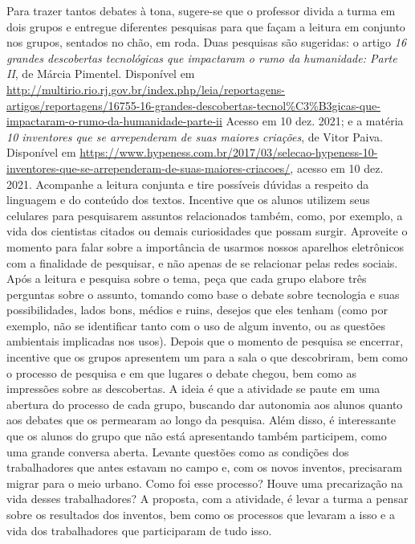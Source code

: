 \documentclass[11pt]{extarticle}
\begin{document}

Para trazer tantos debates à tona, sugere-se que o professor divida a turma em dois grupos e entregue diferentes pesquisas para que façam a leitura em conjunto nos grupos, sentados no chão, em roda. Duas pesquisas são sugeridas: o artigo \textit{16 grandes descobertas tecnológicas que impactaram o rumo da humanidade: Parte II}, de Márcia Pimentel. Disponível em \url{http://multirio.rio.rj.gov.br/index.php/leia/reportagens-artigos/reportagens/16755-16-grandes-descobertas-tecnol%C3%B3gicas-que-impactaram-o-rumo-da-humanidade-parte-ii} Acesso em 10 dez. 2021; e a matéria \textit{10 inventores que se arrependeram de suas maiores criações}, de Vitor Paiva. Disponível em \url{https://www.hypeness.com.br/2017/03/selecao-hypeness-10-inventores-que-se-arrependeram-de-suas-maiores-criacoes/}, acesso em 10 dez. 2021. Acompanhe a leitura conjunta e tire possíveis dúvidas a respeito da linguagem  e do conteúdo dos textos. Incentive que os alunos utilizem seus celulares para pesquisarem assuntos relacionados também, como, por exemplo, a vida dos cientistas citados ou demais curiosidades que possam surgir. Aproveite o momento para falar sobre a importância de usarmos nossos aparelhos eletrônicos com a finalidade de pesquisar, e não apenas de se relacionar pelas redes sociais. Após a leitura e pesquisa sobre o tema, peça que cada grupo elabore três perguntas sobre o assunto, tomando como base o debate sobre tecnologia e suas possibilidades, lados bons, médios e ruins, desejos que eles tenham (como por exemplo, não se identificar tanto com o uso de algum invento, ou as questões ambientais implicadas nos usos). Depois que o momento de pesquisa se encerrar, incentive que os grupos apresentem um para a sala o que descobriram, bem como o processo de pesquisa e em que lugares o debate chegou, bem como as impressões sobre as descobertas. A ideia é que a atividade se paute em uma abertura do processo de cada grupo, buscando dar autonomia aos alunos quanto aos debates que os permearam ao longo da pesquisa. Além disso, é interessante que os alunos do grupo que não está apresentando também participem, como uma grande conversa aberta. Levante questões como as condições dos trabalhadores que antes estavam no campo e, com os novos inventos, precisaram migrar para o meio urbano. Como foi esse processo? Houve uma precarização na vida desses trabalhadores? A proposta, com a atividade, é levar a turma a pensar sobre os resultados dos inventos, bem como os processos que levaram a isso e a vida dos trabalhadores que participaram de tudo isso. 
\end{document}
